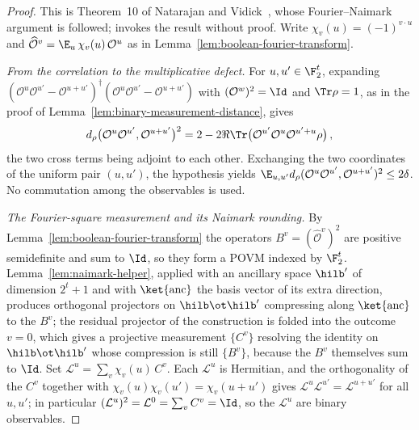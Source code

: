 \begin{proof}
	\leanok
	This is Theorem~10 of Natarajan and Vidick~\cite{Natarajan2017Linearity},
	whose Fourier--Naimark argument is followed; \cite{Ji2020MIPStar} invokes
	the result without proof. Write $\chi_v(u) = (-1)^{v \cdot u}$ and
	$\widehat{\mathcal{O}}^v = \E_u \, \chi_v(u) \, \mathcal{O}^u$ as in
	Lemma~\ref{lem:boolean-fourier-transform}.

	\emph{From the correlation to the multiplicative defect.} For
	$u, u' \in \F_2^t$, expanding
	$(\mathcal{O}^u \mathcal{O}^{u'} - \mathcal{O}^{u+u'})^\dagger
	(\mathcal{O}^u \mathcal{O}^{u'} - \mathcal{O}^{u+u'})$ with
	$(\mathcal{O}^w)^2 = \Id$ and $\Tr \rho = 1$, as in the proof of
	Lemma~\ref{lem:binary-measurement-distance}, gives
	\[
		d_\rho\big(\mathcal{O}^u \mathcal{O}^{u'}, \mathcal{O}^{u+u'}\big)^2
		= 2 - 2 \Re \Tr\big(\mathcal{O}^{u'} \mathcal{O}^u
		\mathcal{O}^{u'+u} \rho\big)\,,
	\]
	the two cross terms being adjoint to each other. Exchanging the two
	coordinates of the uniform pair $(u,u')$, the hypothesis yields
	$\E_{u,u'} d_\rho(\mathcal{O}^u \mathcal{O}^{u'},
	\mathcal{O}^{u+u'})^2 \le 2\delta$. No commutation among the
	observables is used.

	\emph{The Fourier-square measurement and its Naimark rounding.} By
	Lemma~\ref{lem:boolean-fourier-transform} the operators
	$B^v = (\widehat{\mathcal{O}}^v)^2$ are positive semidefinite and sum to
	$\Id$, so they form a POVM indexed by $\F_2^t$.
	Lemma~\ref{lem:naimark-helper}, applied with an ancillary space $\hilb'$
	of dimension $2^t + 1$ and with $\ket{\mathrm{anc}}$ the basis vector of
	its extra direction, produces orthogonal projectors on $\hilb \ot \hilb'$
	compressing along $\ket{\mathrm{anc}}$ to the $B^v$; the residual
	projector of the construction is folded into the outcome $v = 0$, which
	gives a projective measurement $\{C^v\}$ resolving the identity on
	$\hilb \ot \hilb'$ whose compression is still $\{B^v\}$, because the
	$B^v$ themselves sum to $\Id$. Set
	$\mathcal{L}^u = \sum_v \chi_v(u) \, C^v$. Each $\mathcal{L}^u$ is
	Hermitian, and the orthogonality of the $C^v$ together with
	$\chi_v(u) \chi_v(u') = \chi_v(u+u')$ gives
	$\mathcal{L}^u \mathcal{L}^{u'} = \mathcal{L}^{u+u'}$ for all $u, u'$;
	in particular $(\mathcal{L}^u)^2 = \mathcal{L}^0 = \sum_v C^v = \Id$,
	so the $\mathcal{L}^u$ are binary observables.


\end{proof}
